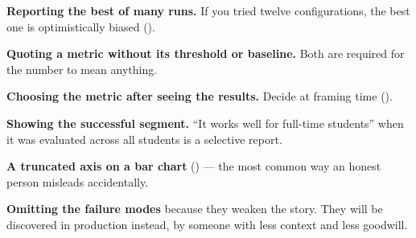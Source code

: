 \begin{pitfall}
\begin{tight}
  \item \textbf{Reporting the best of many runs.} If you tried twelve
        configurations, the best one is optimistically biased ().
  \item \textbf{Quoting a metric without its threshold or baseline.} Both are
        required for the number to mean anything.
  \item \textbf{Choosing the metric after seeing the results.} Decide at framing
        time ().
  \item \textbf{Showing the successful segment.} ``It works well for full-time
        students'' when it was evaluated across all students is a selective report.
  \item \textbf{A truncated axis on a bar chart} () --- the most common
        way an honest person misleads accidentally.
  \item \textbf{Omitting the failure modes} because they weaken the story. They will
        be discovered in production instead, by someone with less context and less
        goodwill.
\end{tight}
\end{pitfall}

